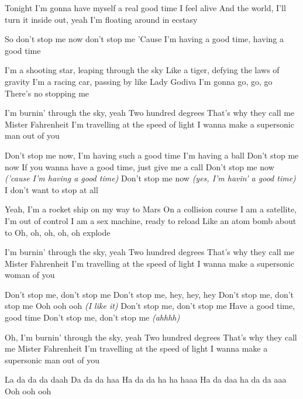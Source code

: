\begin{verse*}
Tonight
I'm gonna have myself a real good time
I feel alive
And the world, I'll turn it inside out, yeah
I'm floating around in ecstasy
\end{verse*}

\begin{verse*}
So don't stop me now don't stop me
'Cause I'm having a good time, having a good time
\end{verse*}

\begin{verse*}
I'm a shooting star, leaping through the sky
Like a tiger, defying the laws of gravity
I'm a racing car, passing by like Lady Godiva
I'm gonna go, go, go
There's no stopping me
\end{verse*}

\begin{verse*}
I'm burnin' through the sky, yeah
Two hundred degrees
That's why they call me Mister Fahrenheit
I'm travelling at the speed of light
I wanna make a supersonic man out of you
\end{verse*}

\begin{chorus}
Don't stop me now, I'm having such a good time
I'm having a ball
Don't stop me now
If you wanna have a good time, just give me a call
Don't stop me now \textit{('cause I'm having a good time)}
Don't stop me now \textit{(yes, I'm havin' a good time)}
I don't want to stop at all
\end{chorus}

\begin{verse*}
Yeah, I'm a rocket ship on my way to Mars
On a collision course
I am a satellite, I'm out of control
I am a sex machine, ready to reload
Like an atom bomb about to
Oh, oh, oh, oh, oh explode
\end{verse*}

\begin{verse*}
I'm burnin' through the sky, yeah
Two hundred degrees
That's why they call me Mister Fahrenheit
I'm travelling at the speed of light
I wanna make a supersonic woman of you
\end{verse*}

\begin{verse*}
Don't stop me, don't stop me
Don't stop me, hey, hey, hey
Don't stop me, don't stop me
Ooh ooh ooh \textit{(I like it)}
Don't stop me, don't stop me
Have a good time, good time
Don't stop me, don't stop me \textit{(ahhhh)}
\end{verse*}

\begin{verse*}
Oh, I'm burnin' through the sky, yeah
Two hundred degrees
That's why they call me Mister Fahrenheit
I'm travelling at the speed of light
I wanna make a supersonic man out of you
\end{verse*}

\thechorus

\begin{verse*}
La da da da daah
Da da da haa
Ha da da ha ha haaa
Ha da daa ha da da aaa
Ooh ooh ooh
\end{verse*}

